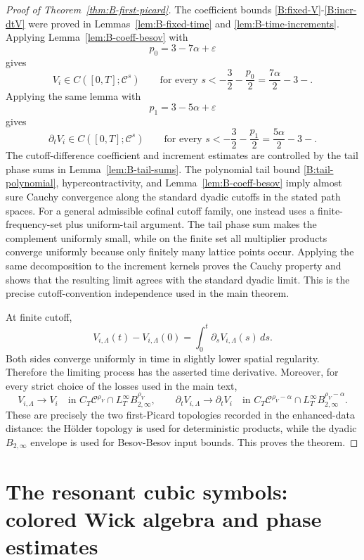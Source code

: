 \documentclass[10pt]{amsart}
\numberwithin{equation}{section}
\theoremstyle{plain}
\theoremstyle{definition}
\theoremstyle{remark}
\newcommand{\C}{\mathcal{C}}
\newcommand{\eps}{\varepsilon}
\begin{document}
\begin{proof}[Proof of Theorem~\ref{thm:B-first-picard}]
The coefficient bounds \eqref{B:fixed-V}-\eqref{B:incr-dtV} were proved in Lemmas~\ref{lem:B-fixed-time} and \ref{lem:B-time-increments}.  Applying Lemma~\ref{lem:B-coeff-besov} with
\[
        p_0=3-7\alpha+\eps
\]
gives
\[
        V_i\in C([0,T];\C^s)
        \qquad\text{for every }s<-\frac{3}{2}-\frac{p_0}{2}
        =\frac{7\alpha}{2}-3-.
\]
Applying the same lemma with
\[
        p_1=3-5\alpha+\eps
\]
gives
\[
        \partial_tV_i\in C([0,T];\C^s)
        \qquad\text{for every }s<-\frac{3}{2}-\frac{p_1}{2}
        =\frac{5\alpha}{2}-3-.
\]
The cutoff-difference coefficient and increment estimates are controlled by the tail phase sums in Lemma~\ref{lem:B-tail-sums}.  The polynomial tail bound \eqref{B:tail-polynomial}, hypercontractivity, and Lemma~\ref{lem:B-coeff-besov} imply almost sure Cauchy convergence along the standard dyadic cutoffs in the stated path spaces.  For a general admissible cofinal cutoff family, one instead uses a finite-frequency-set plus uniform-tail argument.  The tail phase sum makes the complement uniformly small, while on the finite set all multiplier products converge uniformly because only finitely many lattice points occur.  Applying the same decomposition to the increment kernels proves the Cauchy property and shows that the resulting limit agrees with the standard dyadic limit.  This is the precise cutoff-convention independence used in the main theorem.

At finite cutoff,
\[
        V_{i,\Lambda}(t)-V_{i,\Lambda}(0)
        =
        \int_0^t\partial_sV_{i,\Lambda}(s)\,ds.
\]
Both sides converge uniformly in time in slightly lower spatial regularity.  Therefore the limiting process has the asserted time derivative.  Moreover, for every strict choice of the losses used in the main text,
\[
        V_{i,\Lambda}\to V_i\quad\text{in }C_T\C^{\rho_V}
        \cap L_T^\infty B_{2,\infty}^{\rho_V},
        \qquad
        \partial_tV_{i,\Lambda}\to\partial_tV_i
        \quad\text{in }C_T\C^{\rho_V-\alpha}
        \cap L_T^\infty B_{2,\infty}^{\rho_V-\alpha}.
\]
These are precisely the two first-Picard topologies recorded in the enhanced-data distance: the H\"older topology is used for deterministic products, while the dyadic $B_{2,\infty}$ envelope is used for Besov-Besov input bounds.  This proves the theorem.
\end{proof}


\section{The resonant cubic symbols: colored Wick algebra and phase estimates}\label{app:cubic-resonance}
\end{document}
